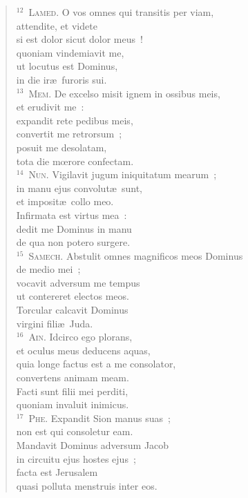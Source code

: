 \begin{flushleft}
\begin{verse}
${}^{12}$~\textsc{Lamed.} O vos omnes qui transitis per viam,\\ attendite, et videte\\ si est dolor sicut dolor meus~!\\ quoniam vindemiavit me,\\ ut locutus est Dominus,\\ in die ir\ae\ furoris sui.\\
${}^{13}$~\textsc{Mem.} De excelso misit ignem in ossibus meis,\\ et erudivit me~:\\ expandit rete pedibus meis,\\ convertit me retrorsum~;\\ posuit me desolatam,\\ tota die mœrore confectam.\\
${}^{14}$~\textsc{Nun.} Vigilavit jugum iniquitatum mearum~;\\ in manu ejus convolut\ae\ sunt,\\ et imposit\ae\ collo meo.\\ Infirmata est virtus mea~:\\ dedit me Dominus in manu\\ de qua non potero surgere.\\
${}^{15}$~\textsc{Samech.} Abstulit omnes magnificos meos Dominus\\ de medio mei~;\\ vocavit adversum me tempus\\ ut contereret electos meos.\\ Torcular calcavit Dominus\\ virgini fili\ae\ Juda.\\
${}^{16}$~\textsc{Ain.} Idcirco ego plorans,\\ et oculus meus deducens aquas,\\ quia longe factus est a me consolator,\\ convertens animam meam.\\ Facti sunt filii mei perditi,\\ quoniam invaluit inimicus.\\
${}^{17}$~\textsc{Phe.} Expandit Sion manus suas~;\\ non est qui consoletur eam.\\ Mandavit Dominus adversum Jacob\\ in circuitu ejus hostes ejus~;\\ facta est Jerusalem\\ quasi polluta menstruis inter eos.\\

\end{verse}
\end{flushleft}
